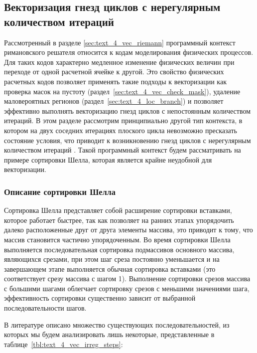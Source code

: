 \subsection{Векторизация гнезд циклов с нерегулярным \\ количеством итераций}\label{sec:text_4_vec_irreg}

Рассмотренный в разделе \ref{sec:text_4_vec_riemann} программный контекст римановского решателя\label{term:riemann_solver7} относится к кодам моделирования физических процессов.
Для таких кодов характерно медленное изменение физических величин при переходе от одной расчетной ячейке к другой.
Это свойство физических расчетных кодов позволяет применять такие подходы к векторизации как проверка масок на пустоту\label{term:meth_vec_check3} (раздел~\ref{sec:text_4_vec_check_mask}), удаление маловероятных регионов\label{term:meth_vec_del_low_prob_regions2} (раздел~\ref{sec:text_4_loc_branch}) и позволяет эффективно выполнять векторизацию гнезд циклов с непостоянным количеством итераций.
В этом разделе рассмотрим принципиально другой тип контекста, в котором на двух соседних итерациях плоского цикла невозможно пресказать состояние условия, что приводит к возникновению гнезд циклов с нерегулярным количеством итераций \cite{Rybakov2019VecIrr,Shabanov2019VecSci}.
Такой программный контекст будем рассматривать на примере сортировки Шелла, которая является крайне неудобной для векторизации.

\subsubsection{Описание сортировки Шелла}

\label{term:shell_sort}Сортировка Шелла \cite{Knut1994} представляет собой расширение сортировки вставками, которое работает быстрее, так как позволяет на ранних этапах упорядочить далеко расположенные друг от друга элементы массива, это приводит к тому, что массив становится частично упорядоченным.
Во время сортировки Шелла выполняется последовательная сортировка подмассивов основного массива, являющихся срезами, при этом шаг среза постоянно уменьшается и на завершающем этапе выполняется обычная сортировка вставками (это соответствует срезу массива с шагом 1).
Выполнение сортировки срезов массива с большими шагами облегчает сортировку срезов с меньшими значениями шага, эффективность сортировки существенно зависит от выбранной последовательности шагов.

В литературе описано множество существующих последовательностей, из которых мы будем анализировать лишь некоторые, представленные в таблице~\ref{tbl:text_4_vec_irreg_steps}:


